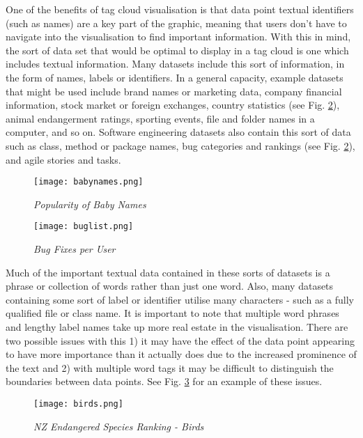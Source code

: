 
One of the benefits of tag cloud visualisation is that data point textual identifiers (such as names) are a key part of the graphic, meaning that users don't have to navigate into the visualisation to find important information. With this in mind, the sort of data set that would be optimal to display in a tag cloud is one which includes textual information. Many datasets include this sort of information, in the form of names, labels or identifiers. In a general capacity, example datasets that might be used include brand names or marketing data, company financial information, stock market or foreign exchanges, country statistics (see Fig. \ref{fig:buglist}), animal endangerment ratings, sporting events, file and folder names in a computer, and so on. Software engineering datasets also contain this sort of data such as class, method or package names, bug categories and rankings (see Fig. \ref{fig:buglist}), and agile stories and tasks. 

\begin{figure}[h!]
	\centering
	\texttt{[image: babynames.png]}
	\caption{\emph{Popularity of Baby Names}}
	\label{fig:babynames}
\end{figure}

\begin{figure}[h!]
	\centering
	\texttt{[image: buglist.png]}
	\caption{\emph{Bug Fixes per User}}
	\label{fig:buglist}
\end{figure}

Much of the important textual data contained in these sorts of datasets is a phrase or collection of words rather than just one word. Also, many datasets containing some sort of label or identifier utilise many characters - such as a fully qualified file or class name. It is important to note that multiple word phrases and lengthy label names take up more real estate in the visualisation. There are two possible issues with this 1) it may have the effect of the data point appearing to have more importance than it actually does due to the increased prominence of the text and 2) with multiple word tags it may be difficult to distinguish the boundaries between data points. See Fig. \ref{fig:birds} for an example of these issues.

\begin{figure}[h!]
	\centering
	\texttt{[image: birds.png]}
	\caption{\emph{NZ Endangered Species Ranking - Birds}}
	\label{fig:birds}
\end{figure}






